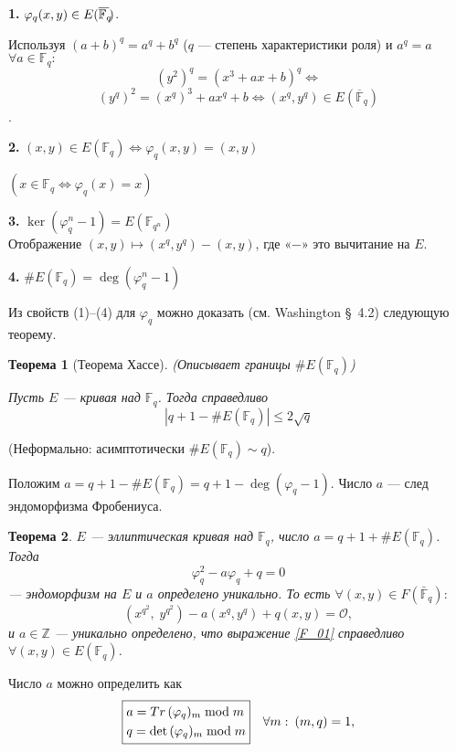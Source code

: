 \documentclass[12pt]{article}
\newcommand{\Z}{{{\mathbb Z}}}
\newcommand{\F}{{{\mathbb F}}}
\newcommand{\bigO}{\mathcal{O}}
\newcommand{\overbar}[1]{\overline{\mkern-0.0mu#1\mkern-4.0mu}}
\newtheorem{theorem}{Теорема}
\theoremstyle{definition}
\theoremstyle{definition}
\theoremstyle{definition}
\begin{document}
\textbf{1.} ${\varphi _q}( {x,y} ) \in E( \overbar{\F_q} )$. 

Используя ${( {a + b} )^q} = {a^q} + {b^q}$ ($q$ — степень характеристики роля) и ${a^q} = a$ $\forall a \in {\F_q}:$
$$
{( y^2 )^q} = (x^3 + ax + b)^q\Leftrightarrow 
$$
$$
( y^q )^2 = (x^q)^3 + a{x^q} + b \Leftrightarrow ( {x^q, y^q} ) \in E ( \overline{\F}_q )
$$. 

\textbf{2.} $( {x,y} ) \in E(\F_q) \Leftrightarrow {\varphi _q}( {x,y} ) = ( {x,y} )$

$( {x \in {\F_q} \Leftrightarrow {\varphi _q}( x ) = x} )$


\textbf{3.} $\mathop{\ker}(\varphi^n_q - 1) = E(\F_{q^n})$ \\
Отображение $( x, y ) \mapsto ( x^q, y^q ) - ( {x,y} )$, где «$-$» это вычитание на $E$.

\textbf{4.} $\# E( \F_q ) = \deg ( \varphi_q^n - 1 )$

Из свойств (1)--(4) для ${\varphi _q}$ можно доказать (см. Washington \S~4.2) следующую теорему. 

\begin{theorem}[Теорема Хассе]
	(Описывает границы $\# E( {{\F_q}} )$)
	
	Пусть $E$ — кривая над ${\F_q}$. Тогда справедливо
	$$
	    | {q + 1 - \# E( {{\F_q}} )} | \leqslant 2\sqrt q 
	$$
\end{theorem}

(Неформально: асимптотически $\# E( {{\F_q}} )\sim q$). 

Положим $a  = q + 1 - \# E( {{\F_q}} ) = q + 1 - \deg ( {{\varphi _q} - 1} )$. Число $a$ — след эндоморфизма Фробениуса.

\begin{theorem}
	\label{theor_01}
	$E$ — эллиптическая кривая над ${\F_q}$, число $a = q + 1 + \# E(\F_q)$. Тогда 
	$$
	    \varphi _q^2 - a{\varphi _q} + q = 0
	$$
	— эндоморфизм на $E$ и $a$ определено уникально. То есть $\forall ( {x,y} ) \in F( \bar{\F}_q ):$
	\begin{equation}\label{F_01}
	( {{x^{{q^2}}},\;{y^{{q^2}}}} ) - a ( x^q, y^q ) + q( {x,y} ) = \bigO,
	\end{equation}
	и $a \in \Z$ — уникально определено, что выражение \eqref{F_01} справедливо $\forall ( {x,y} ) \in E(\F_q)$. 
\end{theorem} 

Число $a$ можно определить как
$$
    \boxed{\begin{gathered}
    a = \mathop{Tr}{( {{\varphi _q}} )_m}\bmod m \hfill \\
    q = \det {( {{\varphi _q}} )_m}\bmod m \hfill \\ 
    \end{gathered}} \quad \forall m:\:( {m,q} ) = 1,
$$
\end{document}
